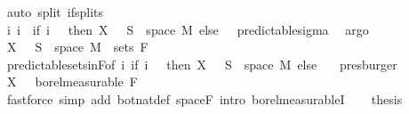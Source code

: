 \begin{isabellebody}
\ {\isacharparenleft}{\kern0pt}auto\ split{\isacharcolon}{\kern0pt}\ if{\isacharunderscore}{\kern0pt}splits{\isacharparenright}{\kern0pt}\isanewline
\ \ \ \ \isamarkupfalse%
\ \isamarkupfalse%
\ {\isachardoublequoteopen}{\isacharparenleft}{\kern0pt}{\isasymUnion}i{\isachardot}{\kern0pt}\ {\isacharbraceleft}{\kern0pt}i{\isacharbraceright}{\kern0pt}\ {\isasymtimes}\ {\isacharparenleft}{\kern0pt}if\ i\ {\isacharequal}{\kern0pt}\ {}\ then\ X\ {}\ {\isacharminus}{\kern0pt}{\isacharbackquote}{\kern0pt}\ S\ {\isasyminter}\ space\ M\ else\ {\isacharbraceleft}{\kern0pt}{\isacharbraceright}{\kern0pt}{\isacharparenright}{\kern0pt}{\isacharparenright}{\kern0pt}\ {\isasymin}\ predictable{\isacharunderscore}{\kern0pt}sigma{\isachardoublequoteclose}\ \isamarkupfalse%
\ argo\isanewline
\ \ \ \ \isamarkupfalse%
\ \isamarkupfalse%
\ {\isachardoublequoteopen}X\ {}\ {\isacharminus}{\kern0pt}{\isacharbackquote}{\kern0pt}\ S\ {\isasyminter}\ space\ M\ {\isasymin}\ sets\ {\isacharparenleft}{\kern0pt}F\ {}{\isacharparenright}{\kern0pt}{\isachardoublequoteclose}\ \isamarkupfalse%
\ predictable{\isacharunderscore}{\kern0pt}sets{\isacharunderscore}{\kern0pt}in{\isacharunderscore}{\kern0pt}F{\isacharbrackleft}{\kern0pt}of\ {\isachardoublequoteopen}{\isasymlambda}i{\isachardot}{\kern0pt}\ if\ i\ {\isacharequal}{\kern0pt}\ {}\ then\ X\ {}\ {\isacharminus}{\kern0pt}{\isacharbackquote}{\kern0pt}\ S\ {\isasyminter}\ space\ M\ else\ {\isacharbraceleft}{\kern0pt}{\isacharbraceright}{\kern0pt}{\isachardoublequoteclose}{\isacharbrackright}{\kern0pt}\ \isamarkupfalse%
\ presburger\isanewline
\ \ \isacommand{{\isacharbraceright}{\kern0pt}}\isamarkupfalse%
\isanewline
\ \ \isamarkupfalse%
\ {\isachardoublequoteopen}X\ {}\ {\isasymin}\ borel{\isacharunderscore}{\kern0pt}measurable\ {\isacharparenleft}{\kern0pt}F\ {}{\isacharparenright}{\kern0pt}{\isachardoublequoteclose}\ \isamarkupfalse%
\ {\isacharparenleft}{\kern0pt}fastforce\ simp\ add{\isacharcolon}{\kern0pt}\ bot{\isacharunderscore}{\kern0pt}nat{\isacharunderscore}{\kern0pt}def\ space{\isacharunderscore}{\kern0pt}F\ intro{\isacharbang}{\kern0pt}{\isacharcolon}{\kern0pt}\ borel{\isacharunderscore}{\kern0pt}measurableI{\isacharparenright}{\kern0pt}\isanewline
\ \ \isamarkupfalse%
\ {\isacharquery}{\kern0pt}thesis\ \isamarkupfalse%
\ {}\ \isamarkupfalse%

\end{isabellebody}
